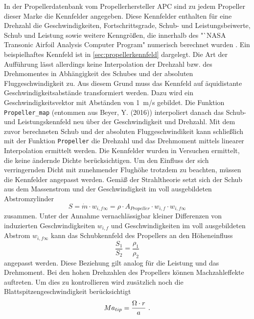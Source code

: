 In der Propellerdatenbank vom Propellerhersteller APC sind zu jedem Propeller dieser Marke die Kennfelder angegeben. Diese Kennfelder enthalten für eine Drehzahl die Geschwindigkeiten, Fortschrittsgrade, Schub- und Leistungsbeiwerte, Schub und Leistung sowie weitere Kenngrößen, die innerhalb des "`NASA Transonic Airfoil Analysis Computer Program"\; numerisch berechnet wurden \cite{apc.theory}. Ein beispielhaftes Kennfeld ist in \ref{sec:propellerkennfeld} dargelegt. Die Art der Aufführung lässt allerdings keine Interpolation der Drehzahl bzw. des Drehmomentes in Abhängigkeit des Schubes und der absoluten Fluggeschwindigkeit zu. Aus diesem Grund muss das Kennfeld auf äquidistante Geschwindigkeitsabstände transformiert werden. Dazu wird ein Geschwindigkeitsvektor mit Abständen von \SI{1}{m/s} gebildet. Die Funktion \texttt{Propeller\_map} (entommen aus Beyer, Y. (2016)) interpoliert danach das Schub- und Leistungskennfeld neu über der Geschwindigkeit und Drehzahl. Mit dem zuvor berechneten Schub und der absoluten Fluggeschwindikeit kann schließlich mit der Funktion \texttt{Propeller} die Drehzahl und das Drehmoment mittels linearer Interpolation ermittelt werden.
Die Kennfelder wurden in Versuchen ermittelt, die keine ändernde Dichte berücksichtigen. Um den Einfluss der sich verringernden Dicht mit zunehmender Flughöhe trotzdem zu beachten, müssen die Kennfelder angepasst werden. Gemäß der Strahltheorie setzt sich der Schub aus dem Massenstrom und der Geschwindigkeit im voll ausgebildeten Abstromzylinder 
\begin{equation}
	S =  \dot{m}\cdot w_{i,f\infty} = \rho\cdot A_{Propeller}\cdot w_{i,f}\cdot w_{i,f\infty}
	\label{eq:propellerschub}
\end{equation}
zusammen. Unter der Annahme vernachlässigbar kleiner Differenzen von  induzierten Geschwindigkeiten \ensuremath{w_{i,f}} und Geschwindigkeiten im voll ausgebildeten Abstrom \ensuremath{w_{i,f\infty}} kann das Schubkennfeld des Propellers an den Höheneinfluss 
\begin{equation}
	\frac{S_1}{S_2} = \frac{\rho_1}{\rho_2}
\end{equation}
angepasst werden. Diese Beziehung gilt analog für die Leistung und das Drehmoment. 
Bei den hohen Drehzahlen des Propellers können Machzahleffekte auftreten. Um dies zu kontrollieren wird zusätzlich noch die Blattspitzengeschwindigkeit berücksichtigt
\begin{equation}
	Ma_{tip} = \frac{\Omega\cdot r}{a} ~\text{.}
\end{equation}

